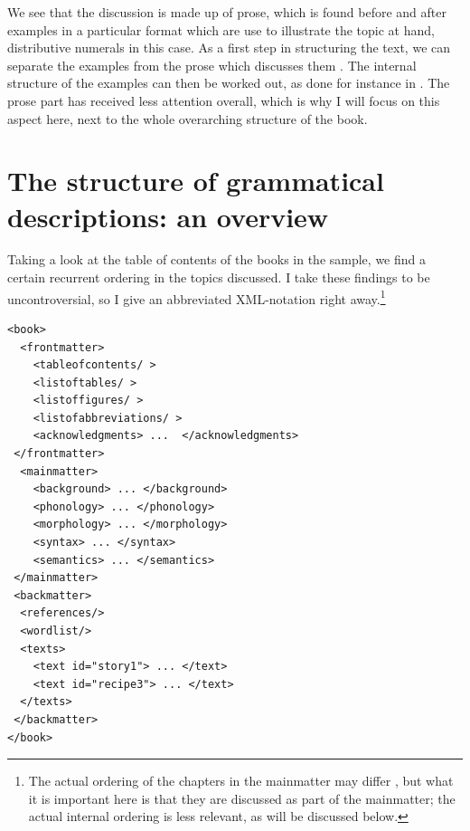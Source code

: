 \documentclass[a4paper,12pt]{article}
\begin{document}
We see that the discussion is made up of prose, which is found before and after examples in a particular format which are use to illustrate the topic at hand, distributive numerals in this case. As a first step in structuring the text, we can separate the examples from the prose which discusses them \citep[cf.][]{Good2004}. The internal structure of the examples can then be worked out, as done for instance in \citet{BowEtAl2003}. The prose part has received less attention overall, which is why I will focus on this aspect here, next to the whole overarching structure of the book.



\section{The structure of grammatical descriptions: an overview}
Taking a look at the table of contents of the books in the sample, we find a certain recurrent ordering in the topics discussed. I take these findings to be uncontroversial, so I give an abbreviated XML-notation right away.\footnote{The actual ordering of the chapters in the mainmatter may differ \citep{Mosel2006craft}, but what it is important here is that they are discussed as part of the mainmatter; the actual internal ordering is less relevant, as will be discussed below.}

\ea\label{xml:book:intro}
\begin{verbatim}
<book>
  <frontmatter>
    <tableofcontents/ >
    <listoftables/ >
    <listoffigures/ >
    <listofabbreviations/ >
    <acknowledgments> ...  </acknowledgments>
 </frontmatter>
  <mainmatter>
    <background> ... </background>
    <phonology> ... </phonology>
    <morphology> ... </morphology>
    <syntax> ... </syntax>
    <semantics> ... </semantics>
 </mainmatter>
 <backmatter>
  <references/>
  <wordlist/>
  <texts>
    <text id="story1"> ... </text>
    <text id="recipe3"> ... </text>
  </texts>
 </backmatter>
</book>
\end{verbatim}
\z
\end{document}

